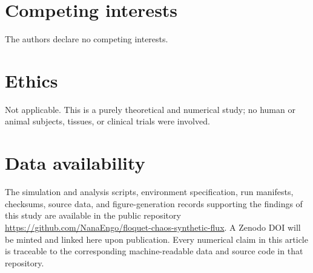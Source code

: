 \documentclass[Phys]{SciPost}
\begin{document}
\section*{Competing interests}
The authors declare no competing interests.

\section*{Ethics}
Not applicable. This is a purely theoretical and numerical study; no human or animal subjects, tissues, or clinical trials were involved.

\section*{Data availability}
\begin{sloppypar}
The simulation and analysis scripts, environment specification, run manifests, checksums, source data, and figure-generation records supporting the findings of this study are available in the public repository \url{https://github.com/NanaEngo/floquet-chaos-synthetic-flux}. A Zenodo DOI will be minted and linked here upon publication. Every numerical claim in this article is traceable to the corresponding machine-readable data and source code in that repository.
\end{sloppypar}


\end{document}
